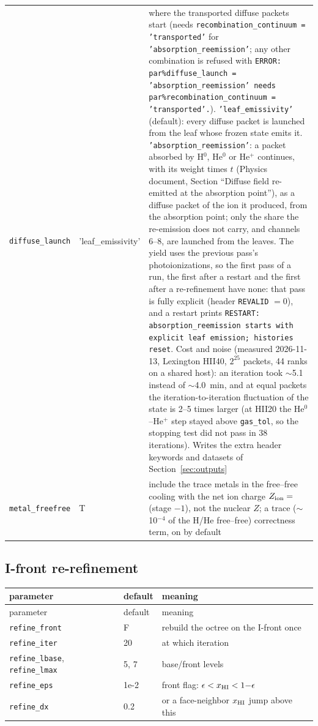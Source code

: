 \documentclass[english,a4paper]{my_memo}
\newcommand{\code}[1]{\texttt{#1}}
\begin{document}
{\begin{longtable}{llp{7.2cm}}
\code{diffuse\_launch} & 'leaf\_emissivity' & where the transported diffuse packets start (needs \code{recombination\_continuum = 'transported'} for \code{'absorption\_reemission'}; any other combination is refused with \code{ERROR: par\%diffuse\_launch = 'absorption\_reemission' needs par\%recombination\_continuum = 'transported'.}).  \code{'leaf\_emissivity'} (default): every diffuse packet is launched from the leaf whose frozen state emits it.  \code{'absorption\_reemission'}: a packet absorbed by H$^0$, He$^0$ or He$^+$ continues, with its weight times $t$ (Physics document, Section ``Diffuse field re-emitted at the absorption point''), as a diffuse packet of the ion it produced, from the absorption point; only the share the re-emission does not carry, and channels 6--8, are launched from the leaves.  The yield uses the previous pass's photoionizations, so the first pass of a run, the first after a restart and the first after a re-refinement have none: that pass is fully explicit (header \code{REVALID} $=0$), and a restart prints \code{RESTART: absorption\_reemission starts with explicit leaf emission; histories reset}.  Cost and noise (measured 2026-11-13, Lexington HII40, $2^{25}$ packets, 44 ranks on a shared host): an iteration took $\sim$5.1 instead of $\sim$4.0~min, and at equal packets the iteration-to-iteration fluctuation of the state is 2--5 times larger (at HII20 the He$^0$--He$^+$ step stayed above \code{gas\_tol}, so the stopping test did not pass in 38 iterations).  Writes the extra header keywords and datasets of Section~\ref{sec:outputs} \\
\code{metal\_freefree} & T & include the trace metals in the free--free cooling with the net ion charge $Z_{\rm ion}=$ (stage $-1$), not the nuclear $Z$; a trace ($\sim$10$^{-4}$ of the H/He free--free) correctness term, on by default \\
\end{longtable}
}

\subsection{I-front re-refinement}
{\small
\begin{longtable}{llp{7.2cm}}
\toprule
parameter & default & meaning \\
\midrule
\endfirsthead
\toprule
parameter & default & meaning \\
\midrule
\endhead
\bottomrule
\endlastfoot
\code{refine\_front} & F & rebuild the octree on the I-front once \\
\code{refine\_iter}  & 20 & at which iteration \\
\code{refine\_lbase}, \code{refine\_lmax} & 5, 7 & base/front levels \\
\code{refine\_eps} & 1e-2 & front flag: $\epsilon < x_{\rm HI} < 1{-}\epsilon$ \\
\code{refine\_dx}  & 0.2  & or a face-neighbor $x_{\rm HI}$ jump above this \\
\end{longtable}
}
\end{document}
